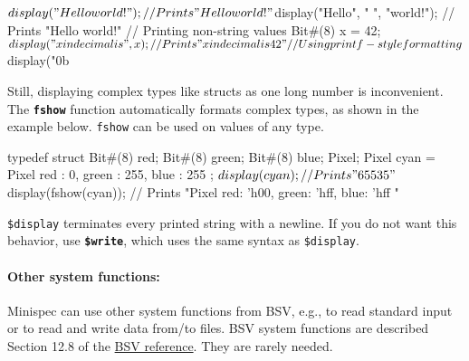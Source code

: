 \begin{mscode}
$display("Hello world!");                 // Prints "Hello world!"
$display("Hello", " ", "world!");         // Prints "Hello world!"
// Printing non-string values
Bit#(8) x = 42;
$display("x in decimal is ", x);          // Prints "x in decimal is 42"
// Using printf-style formatting
$display("0b%
\end{mscode}

Still, displaying complex types like structs as one long number is inconvenient.
The \textbf{\texttt{fshow}} function automatically formats complex types, as shown in the example below.
\texttt{fshow} can be used on values of any type.

\begin{mscode}
typedef struct { Bit#(8) red; Bit#(8) green; Bit#(8) blue; } Pixel;
Pixel cyan = Pixel{ red : 0, green : 255, blue : 255 };
$display(cyan);         // Prints "   65535"
$display(fshow(cyan));  // Prints "Pixel { red: 'h00, green: 'hff, blue: 'hff }"
\end{mscode}

\texttt{\$display} terminates every printed string with a newline. If you do not want this behavior, use \textbf{\texttt{\$write}},
which uses the same syntax as \texttt{\$display}.

\paragraph{Other system functions:} Minispec can use other system functions from BSV,
e.g., to read standard input or to read and write data from/to files.
BSV system functions are described Section 12.8 of the
\href{http://csg.csail.mit.edu/6.S078/6_S078_2012_www/resources/reference-guide.pdf}{BSV reference}.
They are rarely needed.
